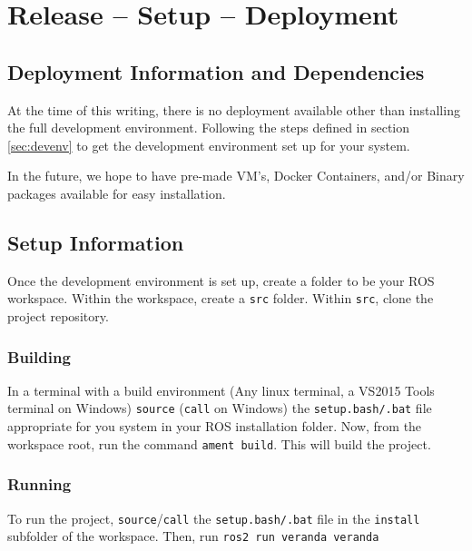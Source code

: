 
\chapter{Release -- Setup -- Deployment}
\section{Deployment Information and Dependencies}
At the time of this writing, there is no deployment available other than installing the full development environment. Following the steps defined in section \ref{sec:devenv} to get the development environment set up for your system.

In the future, we hope to have pre-made VM's, Docker Containers, and/or Binary packages available for easy installation.

\section{Setup Information}
Once the development environment is set up, create a folder to be your ROS workspace. Within the workspace, create a \lstinline|src| folder. Within \lstinline|src|, clone the project repository.

\subsection*{Building}
In a terminal with a build environment (Any linux terminal, a VS2015 Tools terminal on Windows) \lstinline|source| (\lstinline|call| on Windows) the \lstinline|setup.bash/.bat| file appropriate for you system in your ROS installation folder. Now, from the workspace root, run the command \lstinline|ament build|. This will build the project.

\subsection*{Running}
To run the project, \lstinline|source|/\lstinline|call| the \lstinline|setup.bash/.bat| file in the \lstinline|install| subfolder of the workspace. Then, run \lstinline|ros2 run veranda veranda|